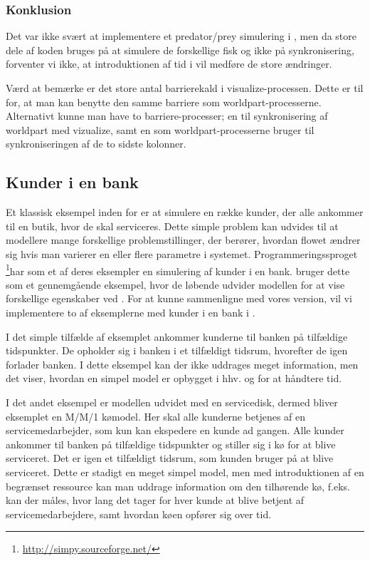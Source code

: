\subsubsection{Konklusion} 
Det var ikke svært at implementere et predator/prey simulering i \pycsp, men da store dele af koden bruges på at simulere  de forskellige fisk og ikke på synkronisering, forventer vi ikke, at introduktionen af tid i \pycsp vil medføre de store ændringer. 

Værd at bemærke er det store antal barrierekald i 
visualize-processen. Dette er til for, at man kan benytte den samme barriere som 
worldpart-processerne. Alternativt kunne man have to barriere-processer; en til 
synkronisering af worldpart med vizualize, samt en som 
worldpart-processerne bruger til synkroniseringen af de to sidste kolonner. 

\subsection{Kunder i en bank}\label{bank-eksempel}
Et klassisk eksempel inden for \des er at simulere  en række kunder, der alle 
ankommer til en butik, hvor de skal serviceres. Dette simple problem kan 
udvides til at modellere mange forskellige problemstillinger, der berører, 
hvordan flowet ændrer sig hvis man varierer en eller flere parametre
i systemet. Programmeringssproget \simpy\footnote{\url{http://simpy.sourceforge.net/}}har som et af deres 
eksempler en simulering af kunder i en bank. \simpy bruger dette som et 
gennemgående eksempel, hvor de løbende udvider modellen for at vise 
forskellige egenskaber ved \simpy. For at kunne sammenligne \simpy  med vores 
version, vil vi implementere to af eksemplerne med kunder 
i en bank i \pycsp.

I det simple tilfælde af eksemplet ankommer kunderne til banken på 
tilfældige tidspunkter.  De opholder sig i banken i et tilfældigt 
tidsrum, hvorefter de igen forlader banken. I dette eksempel kan der ikke 
uddrages meget information, men det viser, hvordan en simpel model er opbygget i 
hhv.  \simpy og \pycsp for at håndtere tid.

I det andet eksempel er modellen udvidet med en servicedisk, dermed bliver eksemplet en M/M/1 kømodel. Her skal alle 
kunderne betjenes af en servicemedarbejder, som kun kan ekspedere en kunde ad 
gangen. Alle kunder ankommer til banken på tilfældige tidspunkter  og stiller sig i 
kø for at blive serviceret. Det er igen et tilfældigt tidsrum, som kunden bruger på at blive 
serviceret.  Dette er stadigt en meget simpel model, men med introduktionen af 
en begrænset ressource kan man uddrage information om den tilhørende kø, f.eks. 
kan der måles, hvor lang det tager for hver kunde at blive betjent af 
servicemedarbejdere, samt hvordan køen opfører sig over tid. 


